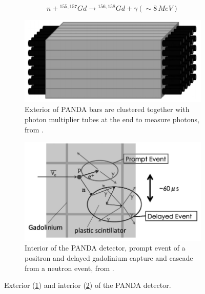 \documentclass[12pt,a4paper]{article}
\begin{document}
\begin{equation}
n + {^{155,157}Gd} \rightarrow {^{156,158} Gd} + \gamma (\sim 8\,MeV)
\label{Gd_eq}
\end{equation}

\begin{figure}[H]
\centering
\begin{subfigure}{.5\textwidth}
  \centering
  \includegraphics[width=\linewidth]{panda_far.png}
  \captionsetup{width=.9\linewidth}
  \caption{Exterior of PANDA bars are clustered together with photon multiplier tubes at the end to measure photons, from \cite{PANDA_2014}.}
  \label{sub_panda_far}
\end{subfigure}%
\begin{subfigure}{.5\textwidth}
  \centering
  \includegraphics[width=\linewidth]{panda_close.png}
  \captionsetup{width=.9\linewidth}
  \caption{Interior of the PANDA detector, prompt event of a positron and delayed gadolinium capture and cascade from a neutron event, from \cite{PANDA_2014}.}
  \label{sub_pana_close}
\end{subfigure}
\caption{Exterior (\ref{sub_panda_far}) and interior (\ref{sub_pana_close}) of the PANDA detector.}
\label{pana_close_and_far}
\end{figure}
\end{document}
